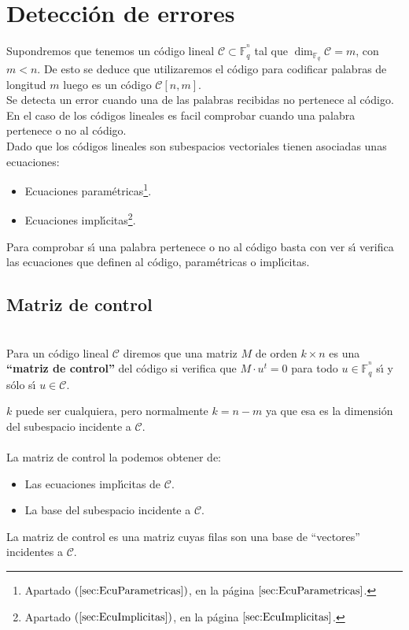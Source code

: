 %
%

\section{Detecci\'on de errores}

Supondremos que tenemos un c\'odigo lineal $\mathcal{C}\subset
\mathbb{F}^{^n}_q$ tal que $\dim_{\mathbb{F}_q} \mathcal{C}=m$, con $m<n$. De
esto se deduce que utilizaremos el c\'odigo para codificar palabras de longitud
$m$ luego es un c\'odigo $\mathcal{C}[n,m]$.\\

Se detecta un error cuando una de las palabras recibidas no pertenece al
c\'odigo. En el caso de los c\'odigos lineales es facil comprobar cuando una
palabra pertenece o no al c\'odigo.\\

Dado que los c\'odigos lineales son subespacios vectoriales tienen asociadas
unas ecuaciones:
\begin{itemize}
\item Ecuaciones param\'etricas\footnote{Apartado $(\ref{sec:EcuParametricas})$,
en la p\'agina $\pageref{sec:EcuParametricas}$.}.
\item Ecuaciones impl\'{\i}citas\footnote{Apartado $(\ref{sec:EcuImplicitas})$,
en la p\'agina $\pageref{sec:EcuImplicitas}$.}.
\end{itemize}
Para comprobar s\'{\i} una palabra pertenece o no al c\'odigo basta con ver
s\'{\i} verifica las ecuaciones que definen al c\'odigo, param\'etricas o
impl\'{\i}citas.
%
\newpage
%
\subsection{Matriz de control}

\begin{definicion}
\ \\
Para un c\'odigo lineal $\mathcal{C}$ diremos que una matriz $M$ de orden
$k\times n$ es una \textbf{``matriz de control''} del c\'odigo si verifica que
$M\cdot u^t = 0$ para todo $u\in \mathbb{F}^{^n}_q$ s\'{\i} y
s\'olo s\'{\i} $u\in \mathcal{C}$.
\end{definicion}
$k$ puede ser cualquiera, pero normalmente $k=n-m$ ya que esa es la dimensi\'on
del subespacio incidente a $\mathcal{C}$.\\ \\
%
La matriz de control la podemos obtener de:
\begin{itemize}
\item Las ecuaciones impl\'{\i}citas de $\mathcal{C}$.
\item La base del subespacio incidente a $\mathcal{C}$.
\end{itemize}
La matriz de control es una matriz cuyas filas son una base de ``vectores''
incidentes a $\mathcal{C}$.

